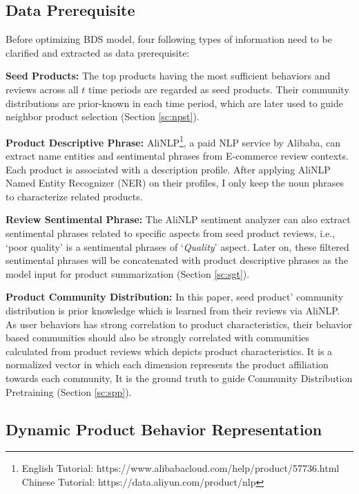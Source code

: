 \subsection{Data Prerequisite} \label{sc:dp}

Before optimizing BDS model, four following types of information need to be clarified and extracted as data prerequisite:

\textbf{Seed Products:} The top products having the most sufficient behaviors and reviews across all $t$ time periods are regarded as seed products. Their community distributions are prior-known in each time period, which are later used to guide neighbor product selection (Section \ref{sc:npst}). 

\textbf{Product Descriptive Phrase:} AliNLP\footnote{English Tutorial: https://www.alibabacloud.com/help/product/57736.html \\ Chinese Tutorial: https://data.aliyun.com/product/nlp}, a paid NLP service by Alibaba, can extract name entities and sentimental phrases from E-commerce review contexts. Each product is associated with a description profile. After applying AliNLP Named Entity Recognizer (NER) on their profiles, I only keep the noun phrases to characterize related products.

\textbf{Review Sentimental Phrase:} The AliNLP sentiment analyzer can also extract sentimental phrases related to specific aspects from seed product reviews, i.e., `poor quality' is a sentimental phrases of `\textit{Quality}' aspect. Later on, these filtered sentimental phrases will be concatenated with product descriptive phrases as the model input for product summarization (Section \ref{sc:sgt}).

\textbf{Product Community Distribution:} In this paper, seed product' community distribution is prior knowledge which is learned from their reviews via AliNLP. As user behaviors has strong correlation to product characteristics, their behavior based communities should also be strongly correlated with communities calculated from product reviews which depicts product characteristics. It is a normalized vector in which each dimension represents the product affiliation towards each community, It is the ground truth to guide Community Distribution Pretraining (Section \ref{sc:spp}).  

\subsection{Dynamic Product Behavior Representation} \label{sc:dpbr}

